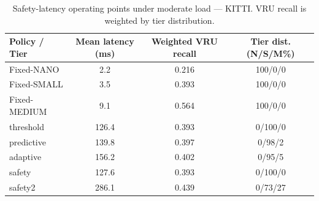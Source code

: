 \begin{table}[t]
\centering
\caption{Safety-latency operating points under moderate load — KITTI. VRU recall is weighted by tier distribution.}
\label{tab:pareto_kitti}
\begin{tabular}{lccc}
\toprule
Policy / Tier & Mean latency (ms) & Weighted VRU recall & Tier dist. (N/S/M\%) \\
\midrule
Fixed-NANO & 2.2 & 0.216 & 100/0/0 \\
Fixed-SMALL & 3.5 & 0.393 & 100/0/0 \\
Fixed-MEDIUM & 9.1 & 0.564 & 100/0/0 \\
\midrule
threshold & 126.4 & 0.393 & 0/100/0 \\
predictive & 139.8 & 0.397 & 0/98/2 \\
adaptive & 156.2 & 0.402 & 0/95/5 \\
safety & 127.6 & 0.393 & 0/100/0 \\
safety2 & 286.1 & 0.439 & 0/73/27 \\
\bottomrule
\end{tabular}
\end{table}